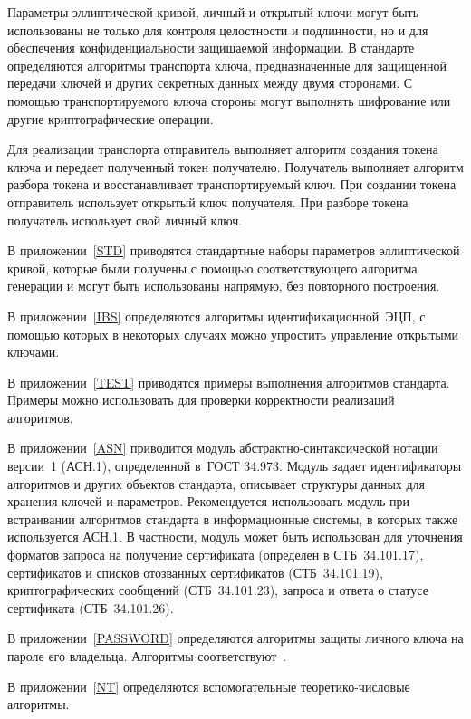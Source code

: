Параметры эллиптической кривой, личный и открытый ключи могут 
быть использованы не только для контроля целостности и подлинности, 
но и для обеспечения конфиденциальности защищаемой информации.
%
В стандарте определяются алгоритмы транспорта ключа, 
предназначенные для защищенной передачи ключей 
и других секретных данных между двумя сторонами. 
%
С помощью транспортируемого ключа стороны могут выполнять 
шифрование или другие криптографические операции.

Для реализации транспорта отправитель 
выполняет алгоритм создания токена 
ключа и передает полученный токен получателю.
%
Получатель выполняет алгоритм разбора токена и восстанавливает
транспортируемый ключ.
%
При создании токена отправитель использует открытый ключ получателя.
При разборе токена получатель использует свой личный ключ.

В приложении~\ref{STD} приводятся стандартные наборы параметров
эллиптической кривой, которые были получены с помощью 
соответствующего алгоритма генерации 
и могут быть использованы напрямую, без повторного построения.

В приложении~\ref{IBS} определяются алгоритмы 
идентификационной~ЭЦП, с помощью которых в некоторых случаях можно 
упростить управление открытыми ключами.

В приложении~\ref{TEST} приводятся примеры выполнения 
алгоритмов стандарта.
Примеры можно использовать для проверки корректности реализаций 
алгоритмов.

В приложении~\ref{ASN} приводится модуль
абстрактно-синтаксической нотации версии~1 (АСН.1),
определенной в~ГОСТ 34.973.
Модуль задает идентификаторы алгоритмов и других объектов 
стандарта, описывает структуры данных для хранения 
ключей и параметров.
%
Рекомендуется использовать модуль 
при встраивании алгоритмов стандарта в информационные системы, 
в которых также используется АСН.1.
В частности, модуль может быть использован для уточнения 
форматов запроса на получение сертификата (определен в СТБ~34.101.17),
сертификатов и списков отозванных сертификатов (СТБ~34.101.19),
криптографических сообщений (СТБ~34.101.23),
запроса и ответа о статусе сертификата (СТБ~34.101.26).

В приложении~\ref{PASSWORD} определяются алгоритмы защиты личного ключа
на пароле его владельца. Алгоритмы соответствуют~\cite{PKCS5}.

В приложении~\ref{NT} определяются вспомогательные теоретико-числовые 
алгоритмы.

